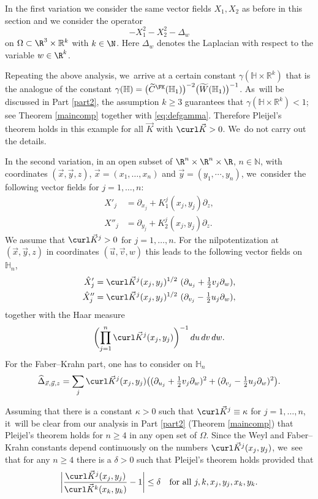 In the first variation we consider the same vector fields $X_1,X_2$ as before in this section and we consider the operator
\[
-X_1^2 - X_2^2 -\Delta_w
\]
on $\Omega \subset \R^3 \times \mathbb R^k$ with $k\in\N$. Here $\Delta_w$ denotes the Laplacian with respect to the variable $w\in\R^k$.

Repeating the above analysis, we~arrive at a certain constant $\gamma (\mathbb H \times \mathbb R^k)$ that is the analogue of the constant $\gamma (\mathbb H) = \bigl(\widetilde C^\FK(\mathbb H_1)\bigr)^{-2} \bigl(\widetilde W (\mathbb H_1)\bigr)^{-1}$. As~will be discussed in Part \ref{part2}, the assumption $k\geq 3$ guarantees that $\gamma (\mathbb H \times \mathbb R^k)<1$; see Theorem \ref{maincomp} together with \eqref{eq:defgamma}. Therefore Pleijel's theorem holds in this example for all $\vec K$ with $\curl\vec K>0$. We~do not carry out the details.

In the second variation, in an open subset of $\R^n\times\R^n\times\R$, $n\in\mathbb N$, with coordinates $(\vec x,\vec y,z)$, $\vec x =(x_1,\dots,x_n)$ and $\vec y=(y_1,\cdots, y_n)$, we~consider the following vector fields for $j=1,\ldots, n$:
\begin{align*}
X'_j&= \partial_{x_j} + K_1^j (x_j,y_j) \partial_z,\\
X''_j& = \partial_{y_j} + K_2^j (x_j,y_j) \partial_z.
\end{align*}
We assume that $\curl \vec K{}^j >0$ for $j=1,\ldots, n$.
For the nilpotentization at $(\vec x,\vec y,z)$ in coordinates $(\vec u,\vec v,w)$ this leads to the following vector fields on $\mathbb H_n$,
\begin{align*}
\hat X'_j & = \curl\vec K{}^j(x_j,y_j)^{1/2} \ (\partial _{u_j} +\tfrac 12 v_j \partial_w),\\
\hat X''_j& = \curl\vec K{}^j(x_j,y_j)^{1/2} \ (\partial _{v_j} - \tfrac 12 u_j \partial_w),
\end{align*}
together with the Haar measure
\[
\biggl(\prod_{j=1}^n \curl \vec K{}^j(x_j,y_j) \biggr)^{-1} \,du\,dv\,dw.
\]
For the Faber--Krahn part, one has to consider on $\mathbb H_n$
\[
\widehat \Delta_{\vec x,\vec y,z}= \sum_j \curl \vec K{}^j(x_j,y_j) \bigl((\partial _{u_j} + \tfrac{ 1}{2} v_j \partial_w)^2+(\partial _{v_j} - \tfrac {1}{2}u_j\partial_w)^2 \bigr).
\]

Assuming that there is a constant $\kappa>0$ such that $\curl \vec K{}^j \equiv \kappa$ for $j=1,\ldots,n$, it~will be clear from our analysis in Part \ref{part2} (Theorem \ref{maincomp}) that Pleijel's theorem holds for $n\geq 4$ in any open set of $\Omega$. Since the Weyl and Faber--Krahn constants depend continuously on the numbers $\curl \vec K{}^j(x_j,y_j)$, we~see that for any $n\geq 4$ there is a $\delta>0$ such that Pleijel's theorem holds provided that
\[
\biggl| \frac{\curl \vec K{}^j(x_j,y_j)}{\curl \vec K{}^k(x_k,y_k)} - 1\biggr| \leq \delta
\quad\text{for all}\ j, k, x_j,y_j, x_k,y_k.
\]

